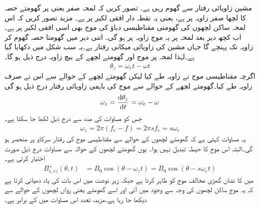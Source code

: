 مشین  زاویائی رفتار سے گھوم رہی ہے۔ تصور کریں کہ لمحہ صفر یعنی  پر گھومتے حصہ کا   لچھا صفر زاویہ پر ہے، یعنی یہ نقطہ دار افقی لکیر پر ہے۔ مزید تصور کریں کہ اس لمحہ ساکن لچھوں کی گھومتی مقناطیسی دباؤ کی موج بھی اسی افقی لکیر پر ہے۔ اب کچھ دیر بعد لمحہ  پر یہ موج زاویہ   پر ہو گی۔ اتنی دیر میں گھومتا حصہ گھوم کر زاویہ   تک پہنچے گا جہاں   مشین کی زاویائی میکانی رفتار ہے۔یہ سب شکل  میں دکھایا گیا ہے۔لہٰذا لمحہ  پر موج اور گھومتے لچھے کے بیچ زاویہ  درج ذیل ہو گا۔
\begin{align}
\theta_z=\omega_e t -\omega t
\end{align}
اگرچہ مقناطیسی موج نے  زاویہ طے کیا لیکن گھومتے لچھے کے حوالے سے اس نے صرف  زاویہ  طے کیا۔گھومتے لچھے کے حوالے سے  موج کی   باہمی زاویائی رفتار  درج ذیل ہو گی
\begin{align}
\omega_z=\frac{\dif \theta_z}{\dif t}=\omega_e -\omega
\end{align}
جس کو مساوات  کی مدد سے درج ذیل لکھا جا سکتا ہے۔
\begin{align}
\omega_z=2 \pi (f_e-f)=2 \pi s f_e = s \omega_e
\end{align}
یہ مساوات کہتی ہے کہ گھومتے لچھوں کے حوالے سے مقناطیسی موج کی رفتار سرکاو  پر منحصر ہو گی۔البتہ اس موج کا حیطہ  تبدیل نہیں ہوا۔ یوں گھومتے لچھوں کے حوالہ سے مساوات  درج ذیل صورت اختیار کرتی ہے۔
\begin{align}
B_{s,rz}^+(\theta,t)&=B_0 \cos (\theta-\omega_z t)=B_0 \cos (\theta -s \omega_e t)
\end{align}
 میں  کا نشان  گھڑی مخالف موج کو ظاہر کرتا ہے جبکہ  زیر نوشت میں   اس بات کی یاد دھیانی کرتا ہے کہ یہ موج ساکن لچھوں کی وجہ سے وجود میں آئی  اور اسے گھومتے یعنی رواں لچھوں کے حوالے سے دیکھا جا رہا ہے۔مزید،  تعدد اس مساوات  میں    کے برابر ہے۔


